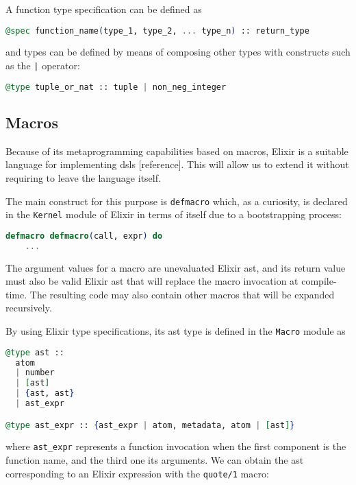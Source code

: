 A function type specification can be defined as 

\begin{lstlisting}[language=elixir,numbers=none,frame=none]
@spec function_name(type_1, type_2, ... type_n) :: return_type
\end{lstlisting}

and types can be defined by means of composing other types with constructs such
as the \verb+|+ operator:

\begin{lstlisting}[language=elixir,numbers=none,frame=none]
@type tuple_or_nat :: tuple | non_neg_integer
\end{lstlisting}

\subsection{Macros}

Because of its metaprogramming capabilities based on macros, Elixir is a suitable
language for implementing \gls{dsl}s [reference]. This will allow us to extend 
it without requiring to leave the language itself.

The main construct for this purpose is \verb|defmacro| which, as a curiosity,
is declared in the \verb|Kernel| module of Elixir in terms of itself due to 
a bootstrapping process:

\begin{lstlisting}[language=elixir,numbers=none,frame=none]
  defmacro defmacro(call, expr) do
    ...
\end{lstlisting}

The argument values for a macro are unevaluated Elixir \gls{ast}, and its return 
value must also be valid Elixir \gls{ast} that will replace the macro invocation 
at compile-time. The resulting code may also contain other macros that will be
expanded recursively.

By using Elixir type specifications, its \gls{ast} type is defined in the 
\verb|Macro| module as

\begin{lstlisting}[language=elixir,numbers=none,frame=none]
@type ast ::
  atom
  | number
  | [ast]
  | {ast, ast}
  | ast_expr

@type ast_expr :: {ast_expr | atom, metadata, atom | [ast]}
\end{lstlisting}

where \verb|ast_expr| represents a function invocation when the first component
is the function name, and the third one its arguments. We can obtain the \gls{ast}
corresponding to an Elixir expression with the \verb|quote/1| macro:

